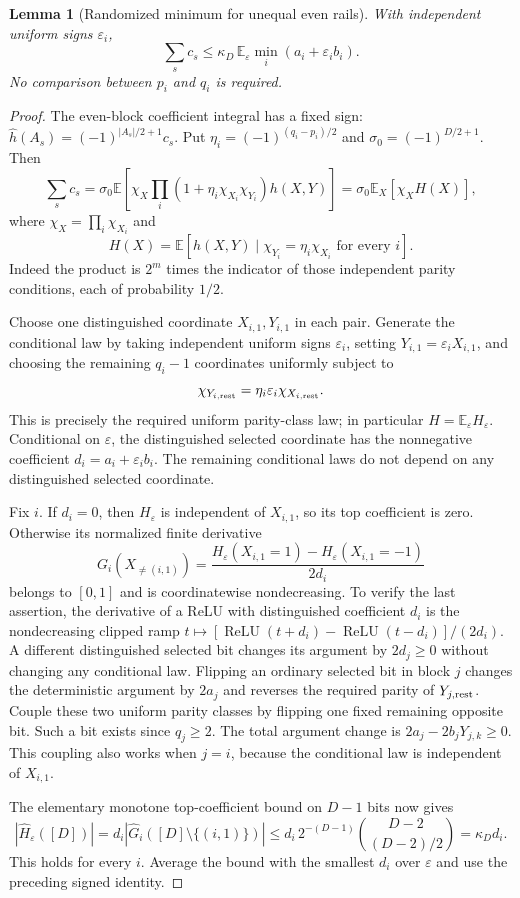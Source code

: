 \documentclass[11pt]{article}
\newtheorem{lemma}[theorem]{Lemma}
\theoremstyle{remark}\newtheorem{remark}[theorem]{Remark}
\begin{document}
\begin{lemma}[Randomized minimum for unequal even rails]
\label{lem:randomized-min-unequal}
With independent uniform signs $\varepsilon_i$,
\[
 \sum_s c_s\le\kappa_D\,
       \mathbb E_\varepsilon\min_i(a_i+\varepsilon_i b_i).
\]
No comparison between $p_i$ and $q_i$ is required.
\end{lemma}
\begin{proof}
The even-block coefficient integral has a fixed sign:
$\widehat h(A_s)=(-1)^{|A_s|/2+1}c_s$.
Put $\eta_i=(-1)^{(q_i-p_i)/2}$ and
$\sigma_0=(-1)^{D/2+1}$. Then
\[
 \sum_s c_s
 =\sigma_0\mathbb E\left[
 \chi_X\prod_i(1+\eta_i\chi_{X_i}\chi_{Y_i})h(X,Y)\right]
 =\sigma_0\mathbb E_X[\chi_X H(X)],
\]
where $\chi_X=\prod_i\chi_{X_i}$ and
\[
 H(X)=\mathbb E\left[h(X,Y)\mid
              \chi_{Y_i}=\eta_i\chi_{X_i}\text{ for every }i\right].
\]
Indeed the product is $2^m$ times the indicator of those independent
parity conditions, each of probability $1/2$.

Choose one distinguished coordinate $X_{i,1},Y_{i,1}$ in each pair.
Generate the conditional law by taking independent uniform signs
$\varepsilon_i$, setting $Y_{i,1}=\varepsilon_iX_{i,1}$, and choosing
the remaining $q_i-1$ coordinates uniformly subject to
\[
 \chi_{Y_{i,\rm rest}}
 =\eta_i\varepsilon_i\chi_{X_{i,\rm rest}}.
\]
This is precisely the required uniform parity-class law; in particular
$H=\mathbb E_\varepsilon H_\varepsilon$. Conditional on $\varepsilon$,
the distinguished selected coordinate has the nonnegative coefficient
$d_i=a_i+\varepsilon_i b_i$. The remaining conditional laws do not
depend on any distinguished selected coordinate.

Fix $i$. If $d_i=0$, then $H_\varepsilon$ is independent of
$X_{i,1}$, so its top coefficient is zero. Otherwise its normalized
finite derivative
\[
 G_i(X_{\ne(i,1)})=
 \frac{H_\varepsilon(X_{i,1}=1)-H_\varepsilon(X_{i,1}=-1)}{2d_i}
\]
belongs to $[0,1]$ and is coordinatewise nondecreasing. To verify the
last assertion, the derivative of a ReLU with distinguished coefficient
$d_i$ is the nondecreasing clipped ramp
$t\mapsto[\operatorname{ReLU}(t+d_i)-\operatorname{ReLU}(t-d_i)]/(2d_i)$.
A different distinguished selected bit changes its argument by
$2d_j\ge0$ without changing any conditional law. Flipping an ordinary
selected bit in block $j$ changes the deterministic argument by $2a_j$
and reverses the required parity of $Y_{j,\rm rest}$. Couple these two
uniform parity classes by flipping one fixed remaining opposite bit.
Such a bit exists since $q_j\ge2$. The total argument change is
$2a_j-2b_jY_{j,k}\ge0$. This coupling also works when $j=i$,
because the conditional law is independent of $X_{i,1}$.

The elementary monotone top-coefficient bound on $D-1$ bits now gives
\[
 |\widehat H_\varepsilon([D])|
 =d_i|\widehat G_i([D]\setminus\{(i,1)\})|
 \le d_i\,2^{-(D-1)}\binom{D-2}{(D-2)/2}
 =\kappa_D d_i.
\]
This holds for every $i$. Average the bound with the smallest $d_i$
over $\varepsilon$ and use the preceding signed identity.
\end{proof}
\end{document}
